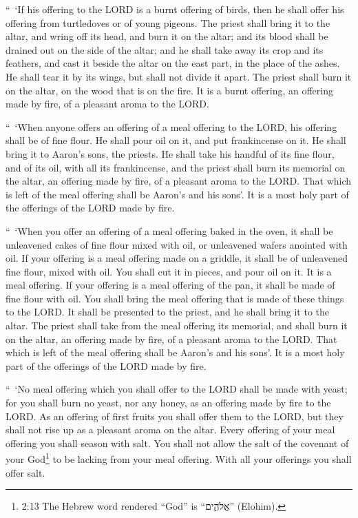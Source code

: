 \myverse{}“ ‘If his offering to the LORD is a burnt offering of birds, then
he shall offer his offering from turtledoves or of young pigeons.
\myverse{}The priest shall bring it to the altar, and wring off its head, and burn it
on the altar; and its blood shall be drained out on the side of the altar;
\myverse{}and he shall take away its crop and its feathers, and cast it beside the altar
on the east part, in the place of the ashes.
\myverse{}He shall tear it by its wings, but shall not divide it apart. The priest shall
burn it on the altar, on the wood that is on the fire. It is a burnt offering, an offering made by fire,
of a pleasant aroma to the LORD.


\mychapter{} \myverse*{}“ ‘When anyone offers an offering of a meal offering to the LORD,
his offering shall be of fine flour. He shall pour oil on it, and put frankincense on it.
\myverse{}He shall bring it to Aaron’s sons, the priests. He shall take his handful of
its fine flour, and of its oil, with all its frankincense, and the priest shall burn its memorial on the
altar, an offering made by fire, of a pleasant aroma to the LORD.
\myverse{}That which is left of the meal offering shall be Aaron’s and his sons’. It is
a most holy part of the offerings of the LORD made by fire.


\myverse{}“ ‘When you offer an offering of a meal offering baked in the oven,
it shall be unleavened cakes of fine flour mixed with oil, or unleavened wafers anointed with oil.
\myverse{}If your offering is a meal offering made on a griddle, it shall be of unleavened
fine flour, mixed with oil.
\myverse{}You shall cut it in pieces, and pour oil on it. It is a meal offering.
\myverse{}If your offering is a meal offering of the pan, it shall be made of fine flour
with oil.
\myverse{}You shall bring the meal offering that is made of these things to the LORD.
It shall be presented to the priest, and he shall bring it to the altar.
\myverse{}The priest shall take from the meal offering its memorial, and shall burn it
on the altar, an offering made by fire, of a pleasant aroma to the LORD.
\myverse{}That which is left of the meal offering shall be Aaron’s and his sons’. It
is a most holy part of the offerings of the LORD made by fire.


\myverse{}“ ‘No meal offering which you shall offer to the LORD shall be
made with yeast; for you shall burn no yeast, nor any honey, as an offering made by fire to the LORD.
\myverse{}As an offering of first fruits you shall offer them to the LORD, but they
shall not rise up as a pleasant aroma on the altar.
\myverse{}Every offering of your meal offering you shall season with salt. You shall
not allow the salt of the covenant of your God\footnote{2:13 The Hebrew word rendered “God” is “אֱלֹהִ֑ים” (Elohim).} to be lacking from
your meal offering. With all your offerings you shall offer salt.


